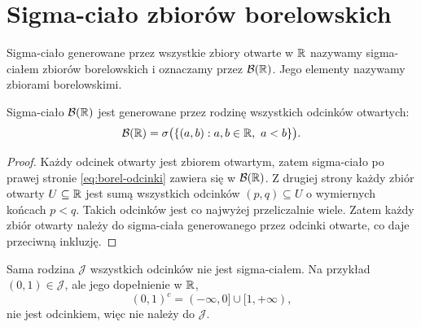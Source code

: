 \section{Sigma-ciało zbiorów borelowskich}
\label{sec:zbiory-borelowskie}

\begin{definicja}
Sigma-ciało generowane przez wszystkie zbiory otwarte w $\mathbb{R}$
nazywamy sigma-ciałem zbiorów borelowskich i oznaczamy przez
$\mathcal{B}(\mathbb{R})$. Jego elementy nazywamy zbiorami borelowskimi.
\end{definicja}

\begin{fakt}
Sigma-ciało $\mathcal{B}(\mathbb{R})$ jest generowane przez rodzinę wszystkich
odcinków otwartych:
\begin{equation}
  \mathcal{B}(\mathbb{R})
  =\sigma\bigl(\{(a,b):a,b\in\mathbb{R},\ a<b\}\bigr).
  \label{eq:borel-odcinki}
\end{equation}
\end{fakt}

\begin{proof}
Każdy odcinek otwarty jest zbiorem otwartym, zatem sigma-ciało po prawej
stronie \eqref{eq:borel-odcinki} zawiera się w $\mathcal{B}(\mathbb{R})$.
Z drugiej strony każdy zbiór otwarty $U\subseteq\mathbb{R}$ jest sumą wszystkich
odcinków $(p,q)\subseteq U$ o wymiernych końcach $p<q$.
Takich odcinków jest co najwyżej przeliczalnie wiele. Zatem każdy zbiór
otwarty należy do sigma-ciała generowanego przez odcinki otwarte,
co daje przeciwną inkluzję.
\end{proof}

\begin{uwaga}
Sama rodzina $\mathcal{J}$ wszystkich odcinków nie jest sigma-ciałem.
Na przykład $(0,1)\in\mathcal{J}$, ale jego dopełnienie w $\mathbb{R}$,
\[
  (0,1)^c=(-\infty,0]\cup[1,+\infty),
\]
nie jest odcinkiem, więc nie należy do $\mathcal{J}$.
\end{uwaga}

